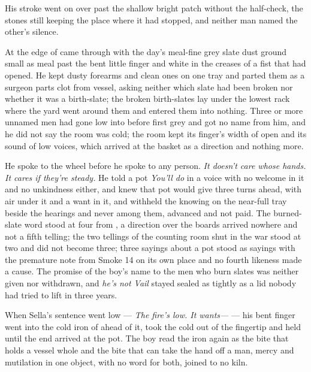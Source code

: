 His stroke went on over  past the shallow bright patch without the half-check, the stones still keeping the place where it had stopped, and neither man named the other's silence.

At the edge of   came through with the day's meal-fine grey slate dust ground small as meal past the bent little finger and white in the creases of a fist that had opened. He kept dusty forearms and clean ones on one tray and parted them as a surgeon parts clot from vessel, asking neither which slate had been broken nor whether it was a birth-slate; the broken birth-slates lay under the lowest rack where the yard went around them and entered them into nothing. Three or more unnamed men had gone low into  before first grey and got no name from him, and he did not say the room was cold; the room kept its finger's width of open and its sound of low voices, which arrived at the basket as a direction and nothing more.

He spoke to the wheel before he spoke to any person. \emph{It doesn't care whose hands. It cares if they're steady.} He told a pot \emph{You'll do} in a voice with no welcome in it and no unkindness either, and knew  that pot would give three turns ahead, with air under it and a want in it, and withheld the knowing on the near-full tray beside the hearings and never among them, advanced and not paid. The burned-slate word stood at four from , a direction over the boards arrived nowhere and not a fifth telling; the two tellings of the counting room shut in the war stood at two and did not become three; three sayings about a pot stood as sayings with the premature note from Smoke 14 on its own place and no fourth likeness made a cause. The promise of the boy's name to the men who burn slates was neither given nor withdrawn, and \emph{he's not Vail} stayed sealed as tightly as a lid nobody had tried to lift in three years.

When Sella's sentence went low --- \emph{The fire's low. It wants---} --- his bent finger went into the cold iron of  ahead of it, took the cold out of the fingertip and held until the end arrived at the pot. The boy read the iron again as the bite that holds a vessel whole and the bite that can take the hand off a man, mercy and mutilation in one object, with no  word for both, joined to no kiln.

\scenebreak

